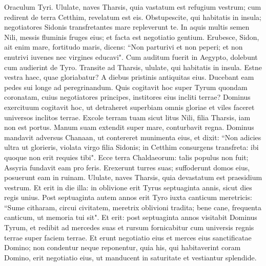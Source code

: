 \begin{biblechapter}  
\verse Oraculum Tyri. Ululate, naves Tharsis, quia vastatum est refugium vestrum; cum redirent de terra Cetthim, revelatum est eis. 
\verse Obstupescite, qui habitatis in insula; negotiatores Sidonis transfretantes mare repleverunt te. 
\verse In aquis multis semen Nili, messis fluminis fruges eius; et facta est negotiatio gentium. 
\verse Erubesce, Sidon, ait enim mare, fortitudo maris, dicens: “Non parturivi et non peperi; et non enutrivi iuvenes nec virgines educavi". 
\verse Cum auditum fuerit in Aegypto, dolebunt cum audierint de Tyro. 
\verse Transite ad Tharsis, ululate, qui habitatis in insula. 
\verse Estne vestra haec, quae gloriabatur? A diebus pristinis antiquitas eius. Ducebant eam pedes sui longe ad peregrinandum. 
\verse Quis cogitavit hoc super Tyrum quondam coronatam, cuius negotiatores principes, institores eius incliti terrae? 
\verse Dominus exercituum cogitavit hoc, ut detraheret superbiam omnis gloriae et viles faceret universos inclitos terrae. 
\verse Excole terram tuam sicut litus Nili, filia Tharsis, iam non est portus. 
\verse Manum suam extendit super mare, conturbavit regna. Dominus mandavit adversus Chanaan, ut contereret munimenta eius, 
\verse et dixit: “Non adicies ultra ut glorieris, violata virgo filia Sidonis; in Cetthim consurgens transfreta: ibi quoque non erit requies tibi". 
\verse Ecce terra Chaldaeorum: talis populus non fuit; Assyria fundavit eam pro feris. Erexerunt turres suas; suffoderunt domos eius, posuerunt eam in ruinam. 
\verse Ululate, naves Tharsis, quia devastatum est praesidium vestrum. 
\verse Et erit in die illa: in oblivione erit Tyrus septuaginta annis, sicut dies regis unius. Post septuaginta autem annos erit Tyro iuxta canticum meretricis: 
\verse “Sume citharam, circui civitatem, meretrix oblivioni tradita; bene cane, frequenta canticum, ut memoria tui sit". 
\verse Et erit: post septuaginta annos visitabit Dominus Tyrum, et redibit ad mercedes suas et rursum fornicabitur cum universis regnis terrae super faciem terrae. 
\verse Et erunt negotiatio eius et merces eius sanctificatae Domino; non condentur neque reponentur, quia his, qui habitaverint coram Domino, erit negotiatio eius, ut manducent in saturitate et vestiantur splendide. 
\end{biblechapter}


